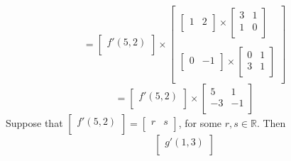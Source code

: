\documentclass{article}
\theoremstyle{plain} %
\numberwithin{thm}{section} %
\theoremstyle{definition}
\begin{document}
\begin{question}{29}
\[        \]
        \[
            = \begin{bmatrix}
                 f'(5,2) \\
            \end{bmatrix}
            \times 
            \begin{bmatrix}
                \begin{bmatrix}
                    1 & 2 \\
                \end{bmatrix}
                \times 
                \begin{bmatrix}
                    3 & 1 \\
                    1 & 0 \\
                \end{bmatrix} \\
                 \\
               \begin{bmatrix}
                   0 & -1 \\
               \end{bmatrix}
               \times 
               \begin{bmatrix}
                    0 & 1 \\
                    3 & 1 \\
               \end{bmatrix} \\
           \end{bmatrix}
        \]
        \[
            = \begin{bmatrix}
                f'(5,2) \\
           \end{bmatrix}
           \times 
           \begin{bmatrix}
               5  & 1 \\
               -3  & -1 \\
          \end{bmatrix}
        \]
        Suppose that \(\begin{bmatrix}
             f'(5,2) \\
        \end{bmatrix} = \begin{bmatrix}
            r  &  s \\
        \end{bmatrix}\), for some \(r,s \in \mathbb{R}\). Then
        \[
            \begin{bmatrix}
                 g'(1,3) \\

\end{bmatrix}\]
\end{question}
\end{document}
